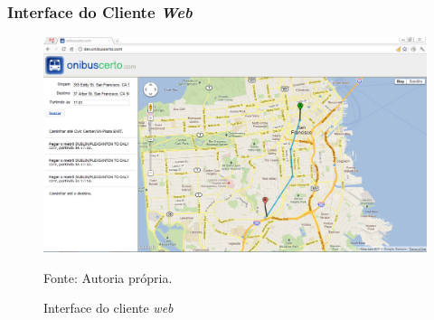\frame
{
\frametitle{Interface do Cliente \emph{Web}}
\begin{figure}
\includegraphics[width=1\textwidth]{./imgs/clienteweb.png}
\caption{Interface do cliente \emph{web}}
\tiny
Fonte: Autoria própria.
\end{figure}
}
